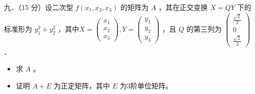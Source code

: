 \documentclass{article}
\begin{document}
九．（15 分）设二次型 \(f\left(x_{1}, x_{2}, x_{3}\right)\) 的矩阵为 \(A\) ，其在正交变换 \(X=Q Y\) 下的标准形为 \(y_{1}^{2}+y_{2}^{2}\) ，其中\(X=\left(\begin{array}{l}x_{1} \\ x_{2} \\ x_{3}\end{array}\right), Y=\left(\begin{array}{l}y_{1} \\ y_{2} \\ y_{3}\end{array}\right)\) ，且 \(Q\) 的第三列为 \(\left(\begin{array}{c}\frac{\sqrt{2}}{2} \\ 0 \\ \frac{\sqrt{2}}{2}\end{array}\right)\) ．

\begin{itemize}
  \item[（1）] 求 \(A\) 。
  \item[（2）] 证明 \(A+E\) 为正定矩阵，其中 \(E\) 为3阶单位矩阵。
\end{itemize}
\end{document}
